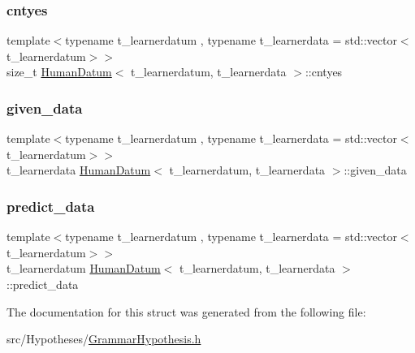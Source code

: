 \subsubsection{\texorpdfstring{cntyes}{cntyes}}
{\footnotesize\ttfamily template$<$typename t\+\_\+learnerdatum , typename t\+\_\+learnerdata  = std\+::vector$<$t\+\_\+learnerdatum$>$$>$ \\
size\+\_\+t \hyperlink{struct_human_datum}{Human\+Datum}$<$ t\+\_\+learnerdatum, t\+\_\+learnerdata $>$\+::cntyes}

\mbox{\label{struct_human_datum_aab13b229dfedb8c2466f47a58e710431}} 
\subsubsection{\texorpdfstring{given\+\_\+data}{given\_data}}
{\footnotesize\ttfamily template$<$typename t\+\_\+learnerdatum , typename t\+\_\+learnerdata  = std\+::vector$<$t\+\_\+learnerdatum$>$$>$ \\
t\+\_\+learnerdata \hyperlink{struct_human_datum}{Human\+Datum}$<$ t\+\_\+learnerdatum, t\+\_\+learnerdata $>$\+::given\+\_\+data}

\mbox{\label{struct_human_datum_ab4676fce2bedc28aca179a17fce99be2}} 
\subsubsection{\texorpdfstring{predict\+\_\+data}{predict\_data}}
{\footnotesize\ttfamily template$<$typename t\+\_\+learnerdatum , typename t\+\_\+learnerdata  = std\+::vector$<$t\+\_\+learnerdatum$>$$>$ \\
t\+\_\+learnerdatum \hyperlink{struct_human_datum}{Human\+Datum}$<$ t\+\_\+learnerdatum, t\+\_\+learnerdata $>$\+::predict\+\_\+data}



The documentation for this struct was generated from the following file\+:\begin{DoxyCompactItemize}
\item 
src/\+Hypotheses/\hyperlink{_grammar_hypothesis_8h}{Grammar\+Hypothesis.\+h}\end{DoxyCompactItemize}
